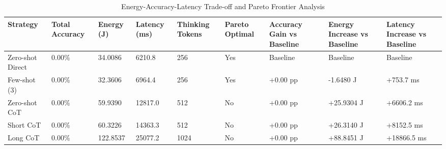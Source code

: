 \begin{table}
\caption{Energy-Accuracy-Latency Trade-off and Pareto Frontier Analysis}
\label{tab:tradeoff_comparison}
\begin{tabular}{lllllllll}
\toprule
Strategy & Total Accuracy & Energy (J) & Latency (ms) & Thinking Tokens & Pareto Optimal & Accuracy Gain vs Baseline & Energy Increase vs Baseline & Latency Increase vs Baseline \\
\midrule
Zero-shot Direct & 0.00\% & 34.0086 & 6210.8 & 256 & Yes & Baseline & Baseline & Baseline \\
Few-shot (3) & 0.00\% & 32.3606 & 6964.4 & 256 & Yes & +0.00 pp & -1.6480 J & +753.7 ms \\
Zero-shot CoT & 0.00\% & 59.9390 & 12817.0 & 512 & No & +0.00 pp & +25.9304 J & +6606.2 ms \\
Short CoT & 0.00\% & 60.3226 & 14363.3 & 512 & No & +0.00 pp & +26.3140 J & +8152.5 ms \\
Long CoT & 0.00\% & 122.8537 & 25077.2 & 1024 & No & +0.00 pp & +88.8451 J & +18866.5 ms \\
\bottomrule
\end{tabular}
\end{table}

